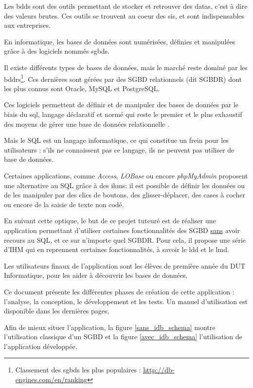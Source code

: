 Les \glspl{bdd} sont des outils permettant de stocker et retrouver des \glspl{data}, c'est à dire des valeurs brutes. 
Ces outils se trouvent au coeur des \glspl{si}, et sont indispensables aux entreprises.

En informatique, les bases de données sont numérisées, définies et manipulées grâce à des logiciels nommés \glspl{sgbd}.

Il existe différents types de bases de données, mais le marché reste dominé par les \glspl{bddr}\footnote{\label{part_de_marché_relationnel}
Classement des \glspl{sgbd} les plus populaires : \url{http://db-engines.com/en/ranking}}. Ces dernières sont gérées par des SGBD relationnels (dit SGBDR) 
dont les plus connus sont Oracle, MySQL et PostgreSQL.

Ces logiciels permettent de définir et de manipuler des bases de données par le biais du \gls{sql}, 
langage déclaratif et normé qui reste le premier et le plus exhaustif des moyens de gérer une base de données relationnelle .

Mais le SQL est un langage informatique, ce qui constitue un frein pour les utilisateurs : s'ils ne connaissent pas
ce langage, ils ne peuvent pas utiliser de base de données.

Certaines applications, comme \textit{Access}, \textit{LOBase} ou encore \textit{phpMyAdmin} proposent une alternative au SQL grâce à des 
\glspl{ihm}: il est possible de définir les données ou de les manipuler par des clics de boutons, des glisser-déplacer, des cases à cocher ou encore de la saisie
de texte non codé. 

En suivant cette optique, le but de ce projet tuteuré est de réaliser une application permettant d'utiliser certaines fonctionnalités des
SGBD \underline{sans} 
avoir recours au SQL, et ce sur n'importe quel SGBDR. Pour cela, il propose une série d'IHM qui en reprennent certaines fonctionnalités,
à savoir le \gls{ldd} et le \gls{lmd}.

Les utilisateurs finaux de l'application sont les élèves de première année du DUT Informatique, pour
les aider à découvrir les bases de données.

Ce document présente les différentes phases de création de cette application : l'analyse, la conception, le développement et les tests.
Un manuel d'utilisation est disponible dans les dernières pages.

Afin de mieux situer l'application, la figure \ref{sans_idb_schema} montre l'utilisation classique d'un SGBD et 
la figure \ref{avec_idb_schema} l'utilisation de l'application développée.

